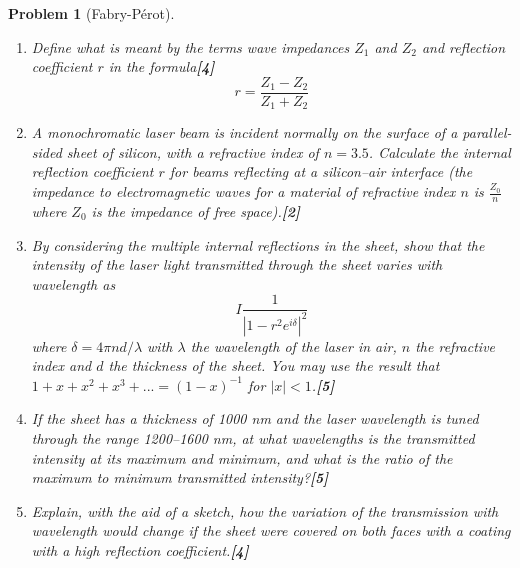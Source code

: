 \documentclass[a4paper]{article}
\theoremstyle{new}
\newtheorem{qns}{Problem}[subsection]
\begin{document}
\begin{qns}[Fabry-Pérot]\leavevmode
\begin{enumerate}[label=(\roman*)]
\item Define what is meant by the terms wave impedances $Z_1$ and $Z_2$ and reflection coefficient $r$ in the formula\hfill\textbf{[4]}
$$r=\frac{Z_1-Z_2}{Z_1+Z_2}$$
\item A monochromatic laser beam is incident normally on the surface of a parallel-sided sheet of silicon, with a refractive index of $n = 3.5$. Calculate the internal reflection coefficient $r$ for beams reflecting at a silicon–air interface (the impedance to electromagnetic waves for a material of refractive index $n$ is $\frac{Z_0}{n}$ where $Z_0$ is the impedance of free space).\hfill\textbf{[2]}
\item By considering the multiple internal reflections in the sheet, show that the intensity of the laser light transmitted through the sheet varies with wavelength as
$$I\frac{1}{|1-r^2e^{i\delta}|^2}$$
where $\delta=4\pi nd/\lambda$ with $\lambda$ the wavelength of the laser in air, $n$ the refractive index and $d$ the thickness of the sheet. You may use the result that $1+x+x^2+x^3+...=(1-x)^{-1}$ for $|x|<1$.\hfill\textbf{[5]}
\item If the sheet has a thickness of 1000 nm and the laser wavelength is tuned through the range 1200–1600 nm, at what wavelengths is the transmitted intensity at its maximum and minimum, and what is the ratio of the maximum to minimum transmitted intensity?\hfill\textbf{[5]}
\item Explain, with the aid of a sketch, how the variation of the transmission with wavelength would change if the sheet were covered on both faces with a coating with a high reflection coefficient.\hfill\textbf{[4]}
\end{enumerate}
\end{qns}
\end{document}
